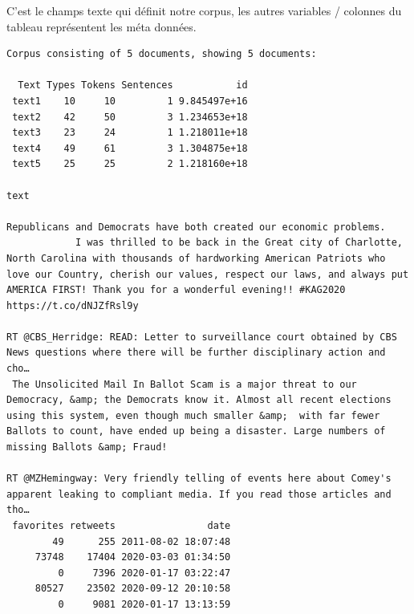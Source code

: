 \documentclass[
  letterpaper,
  DIV=11,
  numbers=noendperiod]{scrreprt}
\newenvironment{Shaded}{\begin{snugshade}}{\end{snugshade}}
\newcommand{\AttributeTok}[1]{\textcolor[rgb]{0.40,0.45,0.13}{#1}}
\newcommand{\DecValTok}[1]{\textcolor[rgb]{0.68,0.00,0.00}{#1}}
\newcommand{\FunctionTok}[1]{\textcolor[rgb]{0.28,0.35,0.67}{#1}}
\newcommand{\NormalTok}[1]{\textcolor[rgb]{0.00,0.23,0.31}{#1}}
\newcommand{\OtherTok}[1]{\textcolor[rgb]{0.00,0.23,0.31}{#1}}
\newcommand{\SpecialCharTok}[1]{\textcolor[rgb]{0.37,0.37,0.37}{#1}}
\begin{document}
C'est le champs texte qui définit notre corpus, les autres variables /
colonnes du tableau représentent les méta données.

\begin{Shaded}
\end{Shaded}

\begin{verbatim}
Corpus consisting of 5 documents, showing 5 documents:

  Text Types Tokens Sentences           id
 text1    10     10         1 9.845497e+16
 text2    42     50         3 1.234653e+18
 text3    23     24         1 1.218011e+18
 text4    49     61         3 1.304875e+18
 text5    25     25         2 1.218160e+18
                                                                                                                                                                                                                                                                                               text
                                                                                                                                                                                                                                 Republicans and Democrats have both created our economic problems.
            I was thrilled to be back in the Great city of Charlotte, North Carolina with thousands of hardworking American Patriots who love our Country, cherish our values, respect our laws, and always put AMERICA FIRST! Thank you for a wonderful evening!! #KAG2020 https://t.co/dNJZfRsl9y
                                                                                                                                                       RT @CBS_Herridge: READ: Letter to surveillance court obtained by CBS News questions where there will be further disciplinary action and cho…
 The Unsolicited Mail In Ballot Scam is a major threat to our Democracy, &amp; the Democrats know it. Almost all recent elections using this system, even though much smaller &amp;  with far fewer Ballots to count, have ended up being a disaster. Large numbers of missing Ballots &amp; Fraud!
                                                                                                                                                       RT @MZHemingway: Very friendly telling of events here about Comey's apparent leaking to compliant media. If you read those articles and tho…
 favorites retweets                date
        49      255 2011-08-02 18:07:48
     73748    17404 2020-03-03 01:34:50
         0     7396 2020-01-17 03:22:47
     80527    23502 2020-09-12 20:10:58
         0     9081 2020-01-17 13:13:59
\end{verbatim}
\end{document}
